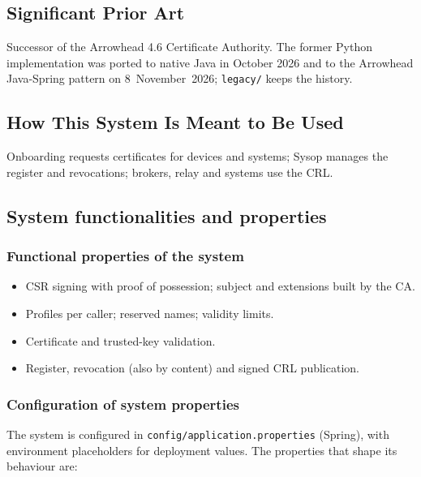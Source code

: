 \documentclass[a4paper]{arrowhead}
\begin{document}
\newpage

\subsection{Significant Prior Art}
\label{sec:prior_art}

Successor of the Arrowhead 4.6 Certificate Authority. The former Python implementation was ported to native Java in October 2026 and to the Arrowhead Java-Spring pattern on 8~November~2026; \texttt{legacy/} keeps the history.

\subsection{How This System Is Meant to Be Used}
\label{sec:use}

Onboarding requests certificates for devices and systems; Sysop manages the register and revocations; brokers, relay and systems use the CRL.

\subsection{System functionalities and properties}
\label{sec:properties}

\subsubsection{Functional properties of the system}

\begin{itemize}
  \item CSR signing with proof of possession; subject and extensions built by the CA.
  \item Profiles per caller; reserved names; validity limits.
  \item Certificate and trusted-key validation.
  \item Register, revocation (also by content) and signed CRL publication.
\end{itemize}

\subsubsection{Configuration of system properties}

The system is configured in \texttt{config/\allowbreak{}application.\allowbreak{}properties} (Spring), with environment placeholders for deployment values. The properties that shape its behaviour are:
\end{document}
